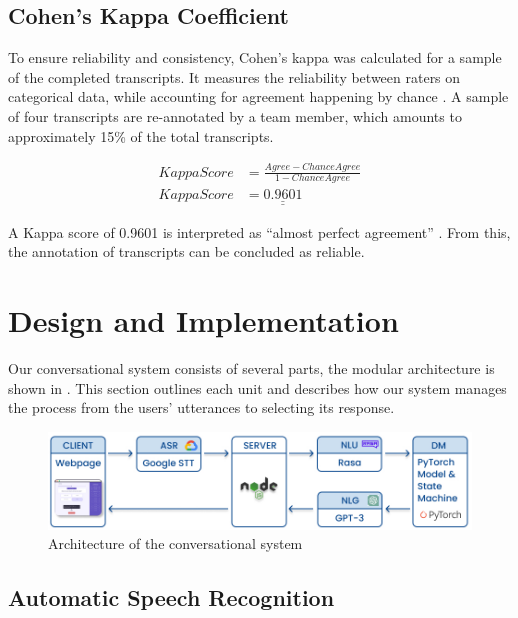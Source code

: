 \documentclass[hidelinks, 11pt]{article}
\begin{document}
\subsection{Cohen's Kappa Coefficient}
To ensure reliability and consistency, Cohen's kappa was calculated for a sample of the completed transcripts. It measures the reliability between raters on categorical data, while accounting for agreement happening by chance \cite{Cohen_1960}. A sample of four transcripts are re-annotated by a team member, which amounts to approximately 15\% of the total transcripts.

\begin{equation}
  \begin{split}
    KappaScore & = \frac{Agree - ChanceAgree}{1 - ChanceAgree} \\
    KappaScore & = \underline{\underline{0.9601}}
  \end{split}
\end{equation}

\noindent
A Kappa score of 0.9601 is interpreted as ``almost perfect agreement'' \cite{McHugh_2012}. From this, the annotation of transcripts can be concluded as reliable.


\section{Design and Implementation}
\label{sec:implementation}

Our conversational system consists of several parts, the modular architecture is shown in . This section outlines each unit and describes how our system manages the process from the users' utterances to selecting its response.

\begin{figure}
  \includegraphics[width=\textwidth]{images/sys_graph.jpg}
  \caption{Architecture of the conversational system}
  \label{fig:system_architecture}
\end{figure}

\subsection{Automatic Speech Recognition}
\label{subsec:asr}
\end{document}
